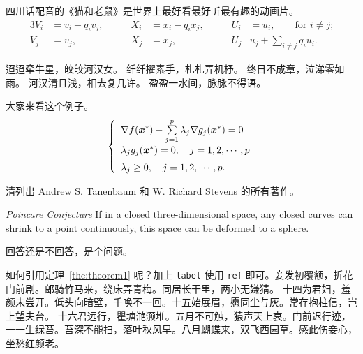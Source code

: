 \documentclass[../Main/thesis.tex]{subfiles}
\begin{document}
\begin{corollary}
  四川话配音的《猫和老鼠》是世界上最好看最好听最有趣的动画片。
  \begin{alignat}{3}
    V_i & =v_i - q_i v_j, & \qquad X_i                   & = x_i - q_i x_j,
        & \qquad U_i      & = u_i,
    \qquad \text{for $i\ne j$;}\label{eq:B}                                 \\
    V_j & = v_j,          & \qquad X_j                   & = x_j,
        & \qquad U_j      & u_j + \sum_{i\ne j} q_i u_i.
  \end{alignat}
\end{corollary}

迢迢牵牛星，皎皎河汉女。
纤纤擢素手，札札弄机杼。
终日不成章，泣涕零如雨。
河汉清且浅，相去复几许。
盈盈一水间，脉脉不得语。

\begin{example}
  大家来看这个例子。
  \begin{equation}
    \label{ktc}
    \left\{\begin{array}{l}
      \nabla f({\mbox{\boldmath $x$}}^*)-\sum\limits_{j=1}^p\lambda_j\nabla g_j({\mbox{\boldmath $x$}}^*)=0 \\[0.3cm]
      \lambda_jg_j({\mbox{\boldmath $x$}}^*)=0,\quad j=1,2,\cdots,p                                         \\[0.2cm]
      \lambda_j\ge 0,\quad j=1,2,\cdots,p.
    \end{array}\right.
  \end{equation}
\end{example}

\begin{exercise}
  清列出 Andrew S. Tanenbaum 和 W. Richard Stevens 的所有著作。
\end{exercise}

\begin{conjecture} \textit{Poincare Conjecture}
  If in a closed three-dimensional space, any closed curves can shrink to a point continuously, this space can be
  deformed to a sphere.
\end{conjecture}

\begin{problem}
回答还是不回答，是个问题。
\end{problem}

如何引用定理~\ref{the:theorem1} 呢？加上 \verb|label| 使用 \verb|ref| 即可。妾发初覆额，折花门前剧。郎骑竹马来，绕床弄青梅。同居长干里，两小无嫌猜。 十四为君妇，羞颜未尝开。低头向暗壁，千唤不一回。十五始展眉，愿同尘与灰。常存抱柱信，岂上望夫台。 十六君远行，瞿塘滟滪堆。五月不可触，猿声天上哀。门前迟行迹，一一生绿苔。苔深不能扫，落叶秋风早。八月蝴蝶来，双飞西园草。感此伤妾心，坐愁红颜老。
\end{document}
